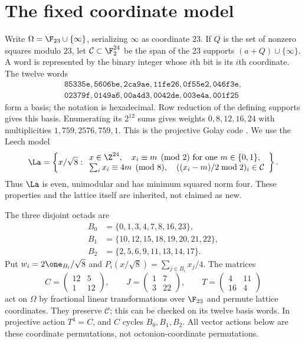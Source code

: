 \section{The fixed coordinate model}
Write $\Omega=\F_{23}\cup\{\infty\}$, serializing $\infty$ as coordinate $23$. If $Q$ is the set of nonzero squares modulo $23$, let $\mathcal C\subset\F_2^{24}$ be the span of the 23 supports $(a+Q)\cup\{\infty\}$. A word is represented by the binary integer whose $i$th bit is its $i$th coordinate. The twelve words
\[
\begin{gathered}
\mathtt{85335e,
5606be,
2ca9ae,
11fe26,
0f55e2,
046f3e,}\\
\mathtt{02379f,
0149a6,
00a4d3,
0042de,
003e4a,
001f25}
\end{gathered}
\]
form a basis; the notation is hexadecimal. Row reduction of the defining supports gives this basis. Enumerating its $2^{12}$ sums gives weights $0,8,12,16,24$ with multiplicities $1,759,2576,759,1$. This is the projective Golay code \cite{chapman}. We use the Leech model \cite[Theorem 1.4]{brouwer}
\begin{equation}\label{eq:model}
\La=\left\{x/\sqrt8:\begin{array}{l}x\in\Z^{24},\quad x_i\equiv m\pmod2\text{ for one }m\in\{0,1\},\\
\sum_i x_i\equiv4m\pmod8,\quad ((x_i-m)/2\bmod2)_i\in\mathcal C\end{array}\right\}.
\end{equation}
Thus $\La$ is even, unimodular and has minimum squared norm four. These properties and the lattice itself are inherited, not claimed as new.

The three disjoint octads are
\begin{align*}
B_0&=\{0,1,3,4,7,8,16,23\},\\
B_1&=\{10,12,15,18,19,20,21,22\},\\
B_2&=\{2,5,6,9,11,13,14,17\}.
\end{align*}
Put $w_i=2\one_{B_i}/\sqrt8$ and $P_i(x/\sqrt8)=\sum_{j\in B_i}x_j/4$. The matrices
\[
C=\begin{pmatrix}12&5\\1&12\end{pmatrix},\qquad
J=\begin{pmatrix}1&7\\3&22\end{pmatrix},\qquad
T=\begin{pmatrix}4&11\\16&4\end{pmatrix}
\]
act on $\Omega$ by fractional linear transformations over $\F_{23}$ and permute lattice coordinates. They preserve $\mathcal C$; this can be checked on its twelve basis words. In projective action $T^4=C$, and $C$ cycles $B_0,B_1,B_2$. All vector actions below are these coordinate permutations, not octonion-coordinate permutations.

